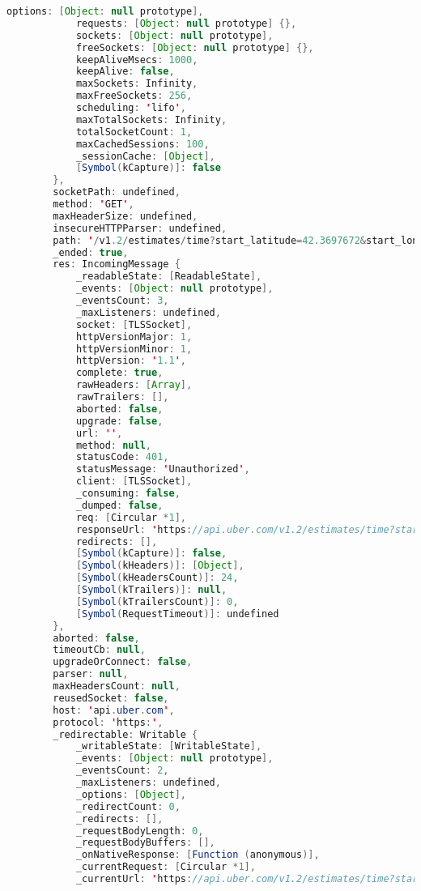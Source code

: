 \begin{lstlisting}[language=Java, caption=Pesan Error Perkakas \textit{Uber CLI}]
            options: [Object: null prototype],
            requests: [Object: null prototype] {},
            sockets: [Object: null prototype],
            freeSockets: [Object: null prototype] {},
            keepAliveMsecs: 1000,
            keepAlive: false,
            maxSockets: Infinity,
            maxFreeSockets: 256,
            scheduling: 'lifo',
            maxTotalSockets: Infinity,
            totalSocketCount: 1,
            maxCachedSessions: 100,
            _sessionCache: [Object],
            [Symbol(kCapture)]: false
        },
        socketPath: undefined,
        method: 'GET',
        maxHeaderSize: undefined,
        insecureHTTPParser: undefined,
        path: '/v1.2/estimates/time?start_latitude=42.3697672&start_longitude=-71.077356',
        _ended: true,
        res: IncomingMessage {
            _readableState: [ReadableState],
            _events: [Object: null prototype],
            _eventsCount: 3,
            _maxListeners: undefined,
            socket: [TLSSocket],
            httpVersionMajor: 1,
            httpVersionMinor: 1,
            httpVersion: '1.1',
            complete: true,
            rawHeaders: [Array],
            rawTrailers: [],
            aborted: false,
            upgrade: false,
            url: '',
            method: null,
            statusCode: 401,
            statusMessage: 'Unauthorized',
            client: [TLSSocket],
            _consuming: false,
            _dumped: false,
            req: [Circular *1],
            responseUrl: 'https://api.uber.com/v1.2/estimates/time?start_latitude=42.3697672&start_longitude=-71.077356',
            redirects: [],
            [Symbol(kCapture)]: false,
            [Symbol(kHeaders)]: [Object],
            [Symbol(kHeadersCount)]: 24,
            [Symbol(kTrailers)]: null,
            [Symbol(kTrailersCount)]: 0,
            [Symbol(RequestTimeout)]: undefined
        },
        aborted: false,
        timeoutCb: null,
        upgradeOrConnect: false,
        parser: null,
        maxHeadersCount: null,
        reusedSocket: false,
        host: 'api.uber.com',
        protocol: 'https:',
        _redirectable: Writable {
            _writableState: [WritableState],
            _events: [Object: null prototype],
            _eventsCount: 2,
            _maxListeners: undefined,
            _options: [Object],
            _redirectCount: 0,
            _redirects: [],
            _requestBodyLength: 0,
            _requestBodyBuffers: [],
            _onNativeResponse: [Function (anonymous)],
            _currentRequest: [Circular *1],
            _currentUrl: 'https://api.uber.com/v1.2/estimates/time?start_latitude=42.3697672&start_longitude=-71.077356',

\end{lstlisting}

